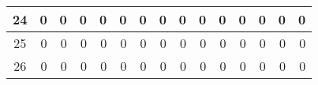 \begin{table}[hb!]
\begin{adjustbox}{width = \textwidth, center}
\begin{tabular}{|c|r|r|r|r|r|r|r|r|r|r|r|r|r|r|}
        \rowcolor[HTML]{FFFFFF} 
        \cellcolor[HTML]{CFE2F3}24                                  & 0                                              & 0                                              & 0                                              & 0                                              & 0                                              & 0                                              & 0                                              & 0                                               & 0                                               & 0                                               & 0                                               & 0                                               & \cellcolor[HTML]{D9D2E9}0                                                       & \cellcolor[HTML]{D9D2E9}0                                                             \\ \hline
        \rowcolor[HTML]{FFFFFF} 
        \cellcolor[HTML]{CFE2F3}25                                  & 0                                              & 0                                              & 0                                              & 0                                              & 0                                              & 0                                              & 0                                              & 0                                               & 0                                               & 0                                               & 0                                               & 0                                               & \cellcolor[HTML]{D9D2E9}0                                                       & \cellcolor[HTML]{D9D2E9}0                                                             \\ \hline
        \rowcolor[HTML]{FFFFFF} 
        \cellcolor[HTML]{CFE2F3}26                                  & 0                                              & 0                                              & 0                                              & 0                                              & 0                                              & 0                                              & 0                                              & 0                                               & 0                                               & 0                                               & 0                                               & 0                                               & \cellcolor[HTML]{D9D2E9}0                                                       & \cellcolor[HTML]{D9D2E9}0                                                             \\ \hline

\end{tabular}
\end{adjustbox}
\end{table}
